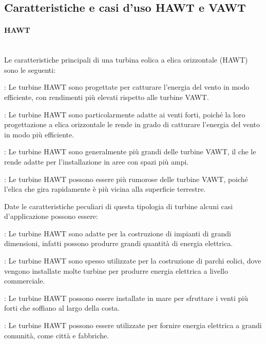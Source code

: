 \subsection{Caratteristiche e casi d'uso HAWT e VAWT}
\paragraph{HAWT}\mbox{}\\
Le caratteristiche principali di una turbina eolica a elica orizzontale (HAWT) sono le seguenti:
\begin{description}[labelindent=5mm]
    \item[$\bullet$ Alta efficienza]: Le turbine HAWT sono progettate per catturare l'energia del vento in modo efficiente, con rendimenti più elevati rispetto alle turbine VAWT.
    \item[$\bullet$ Adatte ai venti forti]: Le turbine HAWT sono particolarmente adatte ai venti forti, poiché la loro progettazione a elica orizzontale le rende in grado di catturare l'energia del vento in modo più efficiente.
    \item[$\bullet$ Dimensioni maggiori]: Le turbine HAWT sono generalmente più grandi delle turbine VAWT, il che le rende adatte per l'installazione in aree con spazi più ampi.
    \item[$\bullet$ Funzionamento più rumoroso]: Le turbine HAWT possono essere più rumorose delle turbine VAWT, poiché l'elica che gira rapidamente è più vicina alla superficie terrestre.
\end{description}
Date le caratteristiche peculiari di questa tipologia di turbine alcuni casi d'applicazione possono essere:
\begin{description}[labelindent=5mm]
    \item[$\bullet$ Impianti di grandi dimensioni]: Le turbine HAWT sono adatte per la costruzione di impianti di grandi dimensioni, infatti possono produrre grandi quantità di energia elettrica.
    \item[$\bullet$ Parchi eolici]: Le turbine HAWT sono spesso utilizzate per la costruzione di parchi eolici, dove vengono installate molte turbine per produrre energia elettrica a livello commerciale.
    \item[$\bullet$ Installazioni offshore]: Le turbine HAWT possono essere installate in mare per sfruttare i venti più forti che soffiano al largo della costa.
    \item[$\bullet$ Alimentazione elettrica per grandi comunità]: Le turbine HAWT possono essere utilizzate per fornire energia elettrica a grandi comunità, come città e fabbriche.
\end{description}
